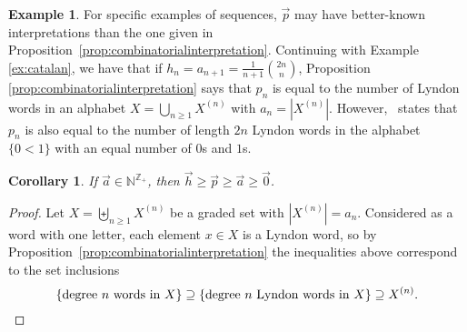 \documentclass[11pt]{amsart}
\newtheorem{corollary}[theorem]{Corollary}
\theoremstyle{definition}
\newtheorem{example}[theorem]{Example}
\numberwithin{equation}{section}
\def\NN{{\mathbb N}}
\def\ZZ{{\mathbb Z}}
\newcommand{\mike}[1]{\todo[size=\tiny,color=green!30]{#1 \\ \hfill --- Mike}}
\newcommand{\lucas}[1]{\todo[size=\tiny,color=red!50]{#1 \\ \hfill --- Lucas}}
\begin{document}
\begin{example}\label{ex:balancedLyndon}
For specific examples of sequences,
$\vec{p}$ may have better-known interpretations
than the one given in  Proposition~\ref{prop:combinatorialinterpretation}.
Continuing with Example \ref{ex:catalan}, we have that if
$h_n = a_{n+1} = \frac{1}{n+1}\binom{2n}{n}$, Proposition
\ref{prop:combinatorialinterpretation} says that $p_n$ is equal to the number
of Lyndon words in an alphabet $X = \bigcup_{n\geq1} X^{(n)}$ with $a_n = |X^{(n)}|$.
However,~\cite[\href{https://oeis.org/A022553}{A022553}]{OEIS} states that $p_n$ is also equal to the number of
length $2n$ Lyndon words in the alphabet $\{0 < 1\}$ with an equal number of $0$s and $1$s.
%
%
\end{example}

\begin{corollary}
If $\vec{a} \in \NN^{\ZZ_+}$, then $\vec{h} \geq \vec{p} \geq \vec{a} \geq \vec{0}$.
\end{corollary}
\begin{proof}
Let $X = \biguplus_{n \ge 1} X^{(n)}$ be a graded set with $|X^{(n)}| = a_{n}$.  
Considered as a word with one letter, each element $x \in X$ is a Lyndon word, so by Proposition~\ref{prop:combinatorialinterpretation} the inequalities above correspond to the set inclusions
\[
\{\text{degree $n$ words in $X$}\} 
\supseteq \{\text{degree $n$ Lyndon words in $X$}\} 
\supseteq X^{(n)}. \qedhere
\]
\end{proof}
\end{document}
